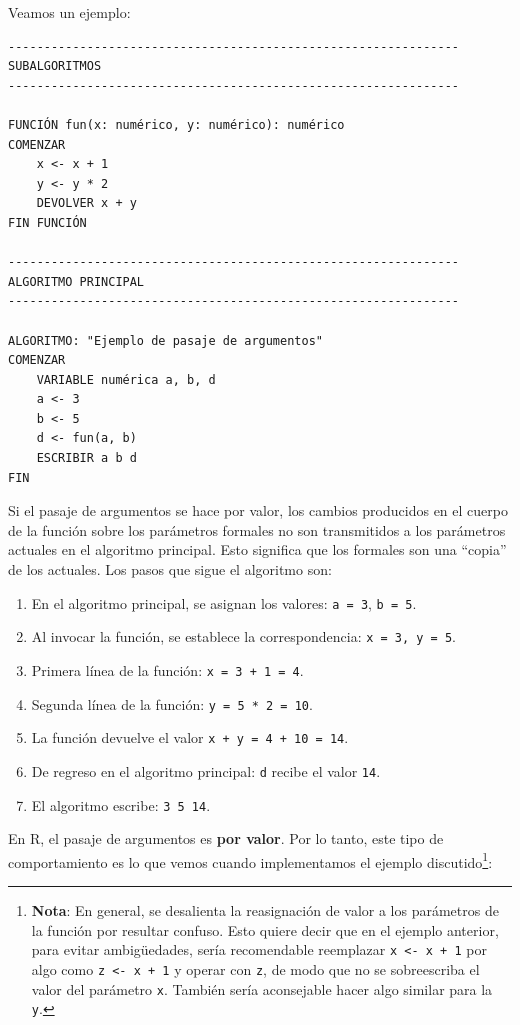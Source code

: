 \documentclass[
]{book}
\providecommand{\tightlist}{%
  \setlength{\itemsep}{0pt}\setlength{\parskip}{0pt}}
\begin{document}
Veamos un ejemplo:

\begin{verbatim}
---------------------------------------------------------------
SUBALGORITMOS
---------------------------------------------------------------

FUNCIÓN fun(x: numérico, y: numérico): numérico
COMENZAR
    x <- x + 1
    y <- y * 2
    DEVOLVER x + y
FIN FUNCIÓN

---------------------------------------------------------------
ALGORITMO PRINCIPAL
---------------------------------------------------------------

ALGORITMO: "Ejemplo de pasaje de argumentos"
COMENZAR
    VARIABLE numérica a, b, d
    a <- 3
    b <- 5
    d <- fun(a, b)
    ESCRIBIR a b d
FIN
\end{verbatim}

Si el pasaje de argumentos se hace por valor, los cambios producidos en el cuerpo de la función sobre los parámetros formales no son transmitidos a los parámetros actuales en el algoritmo principal. Esto significa que los formales son una ``copia'' de los actuales. Los pasos que sigue el algoritmo son:

\begin{enumerate}
\def\labelenumi{\arabic{enumi}.}
\tightlist
\item
  En el algoritmo principal, se asignan los valores: \texttt{a\ =\ 3}, \texttt{b\ =\ 5}.
\item
  Al invocar la función, se establece la correspondencia: \texttt{x\ =\ 3,\ y\ =\ 5}.
\item
  Primera línea de la función: \texttt{x\ =\ 3\ +\ 1\ =\ 4}.
\item
  Segunda línea de la función: \texttt{y\ =\ 5\ *\ 2\ =\ 10}.
\item
  La función devuelve el valor \texttt{x\ +\ y\ =\ 4\ +\ 10\ =\ 14}.
\item
  De regreso en el algoritmo principal: \texttt{d} recibe el valor \texttt{14}.
\item
  El algoritmo escribe: \texttt{3\ 5\ 14}.
\end{enumerate}

En R, el pasaje de argumentos es \textbf{por valor}. Por lo tanto, este tipo de comportamiento es lo que vemos cuando implementamos el ejemplo discutido\footnote{\textbf{Nota}: En general, se desalienta la reasignación de valor a los parámetros de la función por resultar confuso. Esto quiere decir que en el ejemplo anterior, para evitar ambigüedades, sería recomendable reemplazar \texttt{x\ \textless{}-\ x\ +\ 1} por algo como \texttt{z\ \textless{}-\ x\ +\ 1} y operar con \texttt{z}, de modo que no se sobreescriba el valor del parámetro \texttt{x}. También sería aconsejable hacer algo similar para la \texttt{y}.}:
\end{document}
